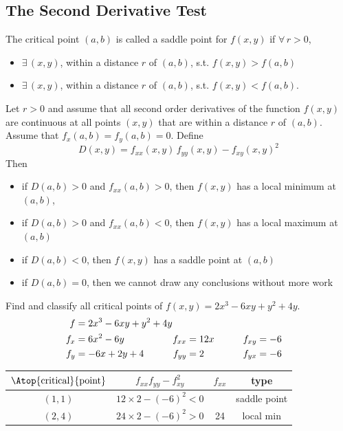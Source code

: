 \subsection*{The Second Derivative Test}
\begin{defn}\label{def saddle point}
The critical point $(a,b)$ is called a saddle point for $f(x,y)$ if $\forall\,r>0$,
\begin{itemize}
\item
$\exists\,(x,y)$, within a distance $r$ of $(a,b)$, s.t. $f(x,y)>f(a,b)$
\item
$\exists\,(x,y)$, within a distance $r$ of $(a,b)$, s.t. $f(x,y)<f(a,b)$.
\end{itemize}
\end{defn}
\begin{theorem}\label{thm second deriv test}
Let $r>0$ and assume that all second order derivatives of the function $f(x,y)$ are continuous at all points $(x,y)$ that are within a distance $r$ of $(a,b)$. Assume that $f_x(a,b)=f_y(a,b)=0$.
Define
\begin{equation*}
D(x,y) = f_{xx}(x,y)\,f_{yy}(x,y) - f_{xy}(x,y)^2
\end{equation*}
Then
\begin{itemize}
\item
if $D(a,b)>0$ and $f_{xx}(a,b)>0$, then $f(x,y)$ has a local minimum at $(a,b)$,
\item
if $D(a,b)>0$ and $f_{xx}(a,b)<0$, then $f(x,y)$ has a local maximum at $(a,b)$
\item
if $D(a,b)<0$, then $f(x,y)$ has a saddle point at $(a,b)$
\item
if $D(a,b)=0$, then we cannot draw any conclusions without more work
\end{itemize}
\end{theorem}
\begin{eg}[$f(x,y)=2x^3 - 6xy + y^2 +4y $]\label{eg:MXMNlocalBb}
Find and classify all critical points of $f(x,y)=2x^3 - 6xy + y^2 +4y $.
\soln
\begin{alignat*}{3}
f&=2x^3 - 6xy + y^2 +4y \hidewidth\\
f_x&=6x^2-6y   & f_{xx}&=12x \qquad & f_{xy}&= -6\\
f_y&=-6x+2y+4 \qquad & f_{yy}&=2\qquad & f_{yx}&= -6
\end{alignat*}
\begin{center}
\renewcommand{\arraystretch}{1.3}
\begin{tabular}{|c|c|c|c|}
\hline
$\Atop{\text{critical}}{\text{point}}$  & $f_{xx}f_{yy}-f_{xy}^2$ &
$f_{xx}$ & type \\
\hline
$(1,1)$  & $12\times 2-(-6)^2<0$ &    & saddle point  \\ \hline
$(2,4)$  & $24\times 2-(-6)^2>0$ & 24 & local min \\  \hline
\end{tabular}
\renewcommand{\arraystretch}{1.0}
\end{center}
\end{eg}
